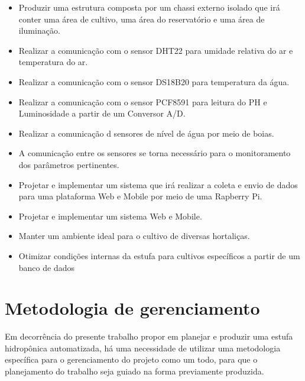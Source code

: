 	\begin{itemize}
 		
 		\item Produzir uma estrutura composta por um chassi externo isolado que irá conter uma área de cultivo, uma área do reservatório e uma área de iluminação.
 		
 		\item Realizar a comunicação com o sensor DHT22 para umidade relativa do ar e temperatura do ar.
 		
 		\item Realizar a comunicação com o sensor DS18B20 para temperatura da água.
 		
 		\item Realizar a comunicação com o sensor PCF8591 para leitura do PH e Luminosidade a partir de um Conversor A/D.
 		
 		\item Realizar a comunicação d sensores de nível de água por meio de boias.
 		
 		\item A comunicação entre os sensores se torna necessário para o monitoramento dos parâmetros pertinentes.
 		
 		\item Projetar e implementar um sistema que irá realizar a coleta e envio de dados para uma plataforma Web e Mobile por meio de uma Rapberry Pi.
 		
 		\item Projetar e implementar um sistema Web e Mobile.
 		
 		\item Manter um ambiente ideal para o cultivo de diversas hortaliças.
 		
 		\item Otimizar condições internas da estufa para cultivos específicos a partir de um banco de dados
 		
	\end{itemize}

\section{Metodologia de gerenciamento}

Em decorrência do presente trabalho propor em planejar e produzir uma estufa hidropônica automatizada, há uma necessidade de utilizar uma metodologia específica para o gerenciamento do projeto como um todo, para que o planejamento do trabalho seja guiado na forma previamente produzida.


